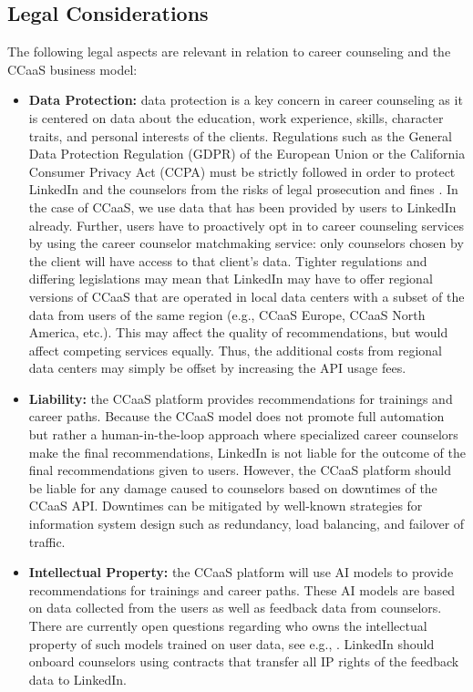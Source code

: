 \subsection{Legal Considerations}

The following legal aspects are relevant in relation to career counseling and the CCaaS business model:

\begin{itemize}
    \item \textbf{Data Protection:} data protection is a key concern in career counseling as it is 
        centered on data about the education, work experience, skills, character traits, and personal 
        interests of the clients. Regulations such as the General Data Protection Regulation (GDPR) of
        the European Union or the California Consumer Privacy Act (CCPA) must be strictly followed
        in order to protect LinkedIn and the counselors from the risks of legal prosecution and fines
        \citep{europeanparliamentRegulationEU20162016, californiastatelegislatureTitle81California2018}.
        In the case of CCaaS, we use data that has been provided by users to LinkedIn already. Further, users
        have to proactively opt in to career counseling services by using the career counselor matchmaking
        service: only counselors chosen by the client will have access to that client's data.
        Tighter regulations and differing legislations may mean that LinkedIn may have to offer regional
        versions of CCaaS that are operated in local data centers with a subset of the data from users of
        the same region (e.g., CCaaS Europe, CCaaS North America, etc.). This may affect the quality of 
        recommendations, but would affect competing services equally. Thus, the additional costs from 
        regional data centers may simply be offset by increasing the API usage fees.
    \item \textbf{Liability:} the CCaaS platform provides recommendations for trainings and career
        paths. Because the CCaaS model does not promote full automation but rather a human-in-the-loop
        approach where specialized career counselors make the final recommendations, LinkedIn is not 
        liable for the outcome of the final recommendations given to users. However, the CCaaS platform
        should be liable for any damage caused to counselors based on downtimes of the CCaaS API. Downtimes 
        can be mitigated by well-known strategies for information system design such as redundancy, load
        balancing, and failover of traffic.
    \item \textbf{Intellectual Property:} the CCaaS platform will use AI models to provide
        recommendations for trainings and career paths. These AI models are based on data collected
        from the users as well as feedback data from counselors. There are currently open questions
        regarding who owns the intellectual property of such models trained on user data, see e.g.,
        \cite{anwerIPChallengesDatafueled2021}. LinkedIn should onboard counselors using contracts 
        that transfer all IP rights of the feedback data to LinkedIn.
\end{itemize}


